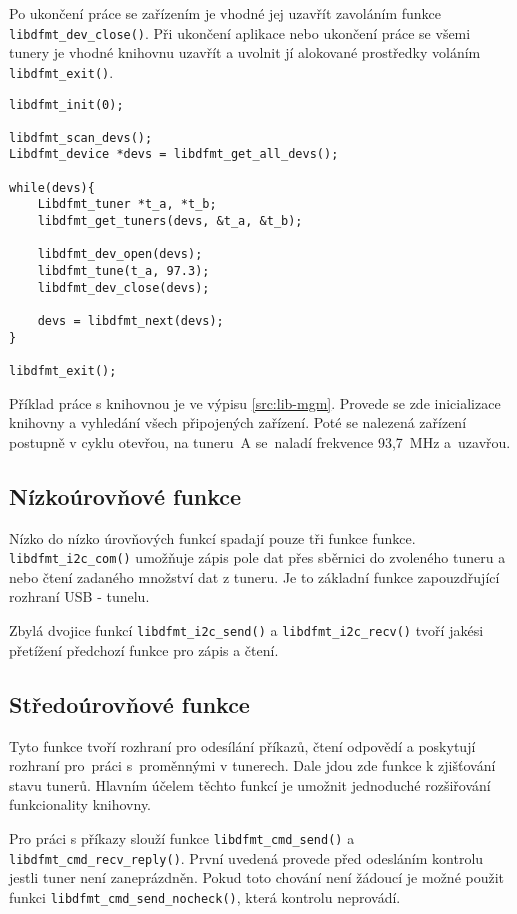 Po ukončení práce se zařízením je vhodné jej uzavřít zavoláním funkce \verb|libdfmt_dev_close()|. Při ukončení aplikace nebo ukončení práce se všemi tunery je vhodné knihovnu uzavřít a uvolnit jí alokované prostředky voláním \verb|libdfmt_exit()|.

\begin{lstlisting}[label=src:lib-mgm, caption=Ukázka práce s knihovnou.]
libdfmt_init(0);

libdfmt_scan_devs();
Libdfmt_device *devs = libdfmt_get_all_devs();

while(devs){
	Libdfmt_tuner *t_a, *t_b;
	libdfmt_get_tuners(devs, &t_a, &t_b);

	libdfmt_dev_open(devs);
	libdfmt_tune(t_a, 97.3);
	libdfmt_dev_close(devs);

	devs = libdfmt_next(devs);
}

libdfmt_exit();
\end{lstlisting}

Příklad práce s knihovnou je ve výpisu \ref{src:lib-mgm}. Provede se zde inicializace knihovny a vyhledání všech připojených zařízení. Poté se nalezená zařízení postupně v cyklu otevřou, na tuneru~A se~naladí frekvence 93,7~MHz a~uzavřou.

\subsection{Nízkoúrovňové funkce}
Nízko do nízko úrovňových funkcí spadají pouze tři funkce funkce. \verb|libdfmt_i2c_com()| umožňuje zápis pole dat přes \iic sběrnici do zvoleného tuneru a nebo čtení zadaného množství dat z tuneru. Je to základní funkce zapouzdřující rozhraní USB - \iic tunelu.

Zbylá dvojice funkcí \verb|libdfmt_i2c_send()| a \verb|libdfmt_i2c_recv()|  tvoří jakési přetížení předchozí funkce pro zápis a čtení.

\subsection{Středoúrovňové funkce}

Tyto funkce tvoří rozhraní pro odesílání příkazů, čtení odpovědí a poskytují rozhraní pro~práci s~proměnnými v tunerech. Dale jdou zde funkce k zjišťování stavu tunerů. Hlavním účelem těchto funkcí je umožnit jednoduché rozšiřování funkcionality knihovny.

Pro práci s příkazy slouží funkce \verb|libdfmt_cmd_send()| a \verb|libdfmt_cmd_recv_reply()|. První uvedená provede před odesláním kontrolu jestli tuner není zaneprázdněn. Pokud toto chování není žádoucí je možné použit funkci \verb|libdfmt_cmd_send_nocheck()|, která kontrolu neprovádí.


